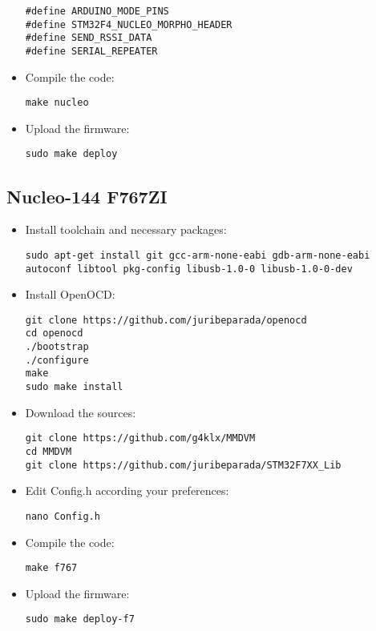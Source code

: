 \documentclass[]{article}
\begin{document}
\begin{itemize}[leftmargin=*]
\begin{verbatim}
#define ARDUINO_MODE_PINS
#define STM32F4_NUCLEO_MORPHO_HEADER
#define SEND_RSSI_DATA
#define SERIAL_REPEATER
\end{verbatim}

\item Compile the code:

\begin{lstlisting}[style=DOS]
make nucleo
\end{lstlisting}

\item Upload the firmware:

\begin{lstlisting}[style=DOS]
sudo make deploy
\end{lstlisting}

\end{itemize}

\subsection{Nucleo-144 F767ZI}

\begin{itemize}[leftmargin=*]
\item Install toolchain and necessary packages:
\begin{lstlisting}[style=DOS]
sudo apt-get install git gcc-arm-none-eabi gdb-arm-none-eabi autoconf libtool pkg-config libusb-1.0-0 libusb-1.0-0-dev
\end{lstlisting}

\item Install OpenOCD:
\begin{lstlisting}[style=DOS]
git clone https://github.com/juribeparada/openocd
cd openocd
./bootstrap
./configure
make
sudo make install
\end{lstlisting}

\item Download the sources:
\begin{lstlisting}[style=DOS]
git clone https://github.com/g4klx/MMDVM
cd MMDVM
git clone https://github.com/juribeparada/STM32F7XX_Lib
\end{lstlisting}

\item Edit Config.h according your preferences:
\begin{lstlisting}[style=DOS]
nano Config.h
\end{lstlisting}

\item Compile the code:
\begin{lstlisting}[style=DOS]
make f767
\end{lstlisting}

\item Upload the firmware:
\begin{lstlisting}[style=DOS]
sudo make deploy-f7
\end{lstlisting}

\end{itemize}
\end{document}
